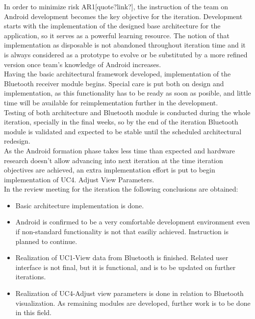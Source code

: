 			In order to minimize risk AR1[quote?link?], the instruction of the team on Android development becomes the key objective for the iteration. Development starts with the implementation of the designed base architecture for the application, so it serves as a powerful learning resource. The notion of that implementation as disposable is not abandoned throughout iteration time and it is always considered as a prototype to evolve or be substituted by a more refined version once team's knowledge of Android increases.\\

			Having the basic architectural framework developed, implementation of the Bluetooth receiver module begins. Special care is put both on design and implementation, as this functionality has to be ready as soon as posible, and little time will be available for reimplementation further in the development.\\

			Testing of both architecture and Bluetooth module is conducted during the whole iteration, specially in the final weeks, so by the end of the iteration Bluetooth module is validated and expected to be stable until the scheduled architectural redesign.\\

			As the Android formation phase takes less time than expected and hardware research doesn't allow advancing into next iteration at the time iteration objectives are achieved, an extra implementation effort is put to begin implementation of UC4. Adjust View Parameters.\\

			In the review meeting for the iteration the following conclusions are obtained:
			\begin{itemize}
				\item Basic architecture implementation is done.
				\item Android is confirmed to be a very comfortable development environment even if non-standard functionality is not that easiliy achieved. Instruction is planned to continue.
				\item Realization of UC1-View data from Bluetooth is finished. Related user interface is not final, but it is functional, and is to be updated on further iterations.
				\item Realization of UC4-Adjust view parameters is done in relation to Bluetooth visualization. As remaining modules are developed, further work is to be done in this field.
			\end{itemize}

